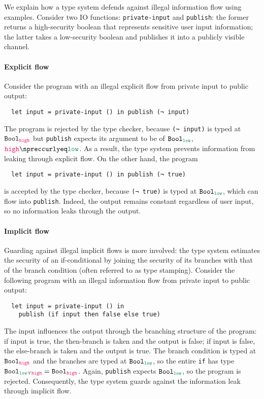 We explain how a type system defends against illegal information flow using
examples. Consider two IO functions: \texttt{private-input} and
\texttt{publish}: the former returns a high-security boolean that represents
sensitive user input information; the latter takes a low-security boolean and
publishes it into a publicly visible channel.

\paragraph{Explicit flow} Consider the program with an illegal explicit flow
from private input to public output:
\begin{verbatim}
  let input = private-input () in publish (¬ input)
\end{verbatim}
The program is rejected by the type checker, because \texttt{(¬ input)} is typed
at $\Bool_{\high}$ but \texttt{publish} expects its argument to be of
$\Bool_{\low}$, $\high \npreccurlyeq \low$. As a result, the type system
prevents information from leaking through explicit flow. On the other hand, the
program
\begin{verbatim}
  let input = private-input () in publish (¬ true)
\end{verbatim}
is accepted by the type checker, because \texttt{(¬ true)} is typed at
$\Bool_{\low}$, which can flow into \texttt{publish}. Indeed, the output remains
constant regardless of user input, so no information leaks through the output.

\paragraph{Implicit flow} Guarding against illegal implicit flows is
more involved: the type system estimates the security of an if-conditional by
joining the security of its branches with that of the branch condition (often
referred to as type stamping). Consider the following program with an illegal
information flow from private input to public output:
\begin{verbatim}
  let input = private-input () in
    publish (if input then false else true)
\end{verbatim}
The input influences the output through the branching structure of the program:
if input is true, the then-branch is taken and the output is false; if input is
false, the else-branch is taken and the output is true. The branch condition is
typed at $\Bool_{\high}$ and the branches are typed at $\Bool_{\low}$, so the
entire \texttt{if} has type $\Bool_{\low \curlyvee \high} = \Bool_{\high}$.
Again, \texttt{publish} expects $\Bool_{\low}$, so the program is rejected.
Consequently, the type system guards against the information leak through
implicit flow.

